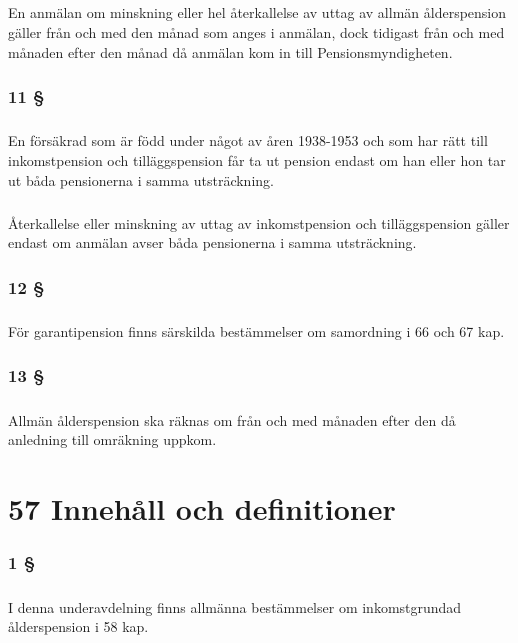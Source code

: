 \documentclass[a4paper,notitlepage,openany,10pt]{book}
\begin{document}
\paragraph*{}
En anmälan om minskning eller hel återkallelse av uttag av allmän ålderspension gäller från och med den månad som anges i anmälan, dock tidigast från och med månaden efter den månad då anmälan kom in till Pensionsmyndigheten.
\subsection*{11 §}
\paragraph*{}
En försäkrad som är född under något av åren 1938-1953 och som har rätt till inkomstpension och tilläggspension får ta ut pension endast om han eller hon tar ut båda pensionerna i samma utsträckning.
\paragraph*{}
Återkallelse eller minskning av uttag av inkomstpension och tilläggspension gäller endast om anmälan avser båda pensionerna i samma utsträckning.
\subsection*{12 §}
\paragraph*{}
För garantipension finns särskilda bestämmelser om samordning i 66 och 67 kap.
\subsection*{13 §}
\paragraph*{}
Allmän ålderspension ska räknas om från och med månaden efter den då anledning till omräkning uppkom.
\chapter*{57 Innehåll och definitioner}
\subsection*{1 §}
\paragraph*{}
I denna underavdelning finns allmänna bestämmelser om inkomstgrundad ålderspension i 58 kap.
\end{document}
